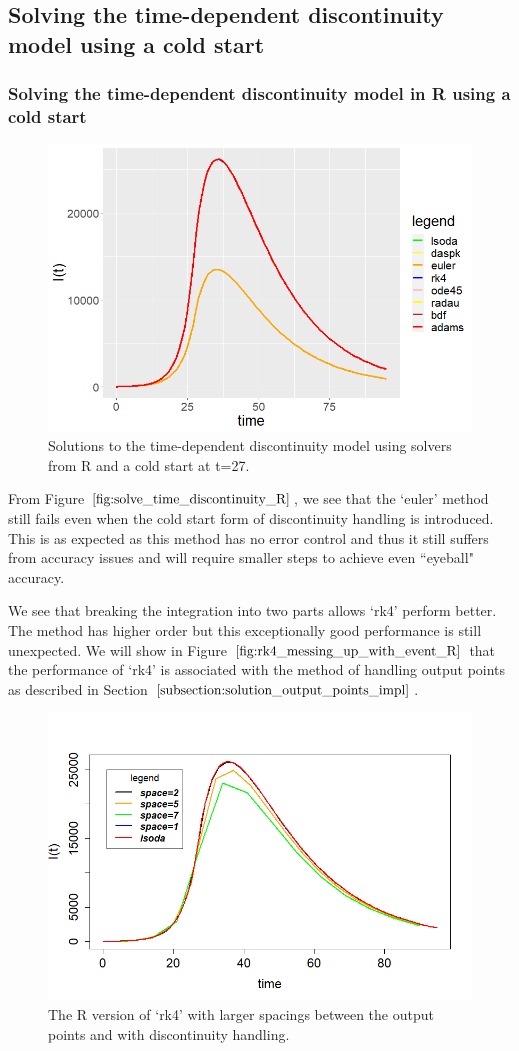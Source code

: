 \subsection{Solving the time-dependent discontinuity model using a cold start} 
\subsubsection{Solving the time-dependent discontinuity model in R using a cold start} 
\begin{figure}[H]
\centering
\includegraphics[width=0.7\linewidth]{./figures/solve_time_discontinuity_R}
\caption{Solutions to the time-dependent discontinuity model using solvers from R and a cold start at t=27.}
\label{fig:solve_time_discontinuity_R}
\end{figure}
From Figure $\ref{fig:solve_time_discontinuity_R}$, we see that the `euler' method still fails even when the cold start form of discontinuity handling is introduced. This is as expected as this method has no error control and thus it still suffers from accuracy issues and will require smaller steps to achieve even ``eyeball" accuracy.

We see that breaking the integration into two parts allows `rk4' perform better. The method has higher order but this exceptionally good performance is still unexpected. We will show in Figure $\ref{fig:rk4_messing_up_with_event_R}$ that the performance of `rk4' is associated with the method of handling output points as described in Section $\ref{subsection:solution_output_points_impl}$.

\begin{figure}[H]
\centering
\includegraphics[width=0.7\linewidth]{./figures/rk4_messing_up_with_event_R}
\caption{The R version of `rk4' with larger spacings between the output points and with discontinuity handling.}
\label{fig:rk4_messing_up_with_event_R}
\end{figure}

